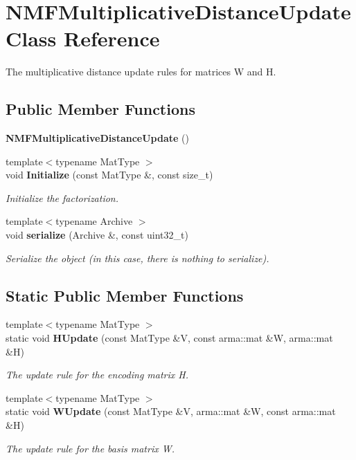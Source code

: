 \section{N\+M\+F\+Multiplicative\+Distance\+Update Class Reference}
\label{classmlpack_1_1amf_1_1NMFMultiplicativeDistanceUpdate}


The multiplicative distance update rules for matrices W and H.  


\subsection*{Public Member Functions}
\begin{DoxyCompactItemize}
\item 
\textbf{ N\+M\+F\+Multiplicative\+Distance\+Update} ()
\item 
{\footnotesize template$<$typename Mat\+Type $>$ }\\void \textbf{ Initialize} (const Mat\+Type \&, const size\+\_\+t)
\begin{DoxyCompactList}\small\item\em Initialize the factorization. \end{DoxyCompactList}\item 
{\footnotesize template$<$typename Archive $>$ }\\void \textbf{ serialize} (Archive \&, const uint32\+\_\+t)
\begin{DoxyCompactList}\small\item\em Serialize the object (in this case, there is nothing to serialize). \end{DoxyCompactList}\end{DoxyCompactItemize}
\subsection*{Static Public Member Functions}
\begin{DoxyCompactItemize}
\item 
{\footnotesize template$<$typename Mat\+Type $>$ }\\static void \textbf{ H\+Update} (const Mat\+Type \&V, const arma\+::mat \&W, arma\+::mat \&H)
\begin{DoxyCompactList}\small\item\em The update rule for the encoding matrix H. \end{DoxyCompactList}\item 
{\footnotesize template$<$typename Mat\+Type $>$ }\\static void \textbf{ W\+Update} (const Mat\+Type \&V, arma\+::mat \&W, const arma\+::mat \&H)
\begin{DoxyCompactList}\small\item\em The update rule for the basis matrix W. \end{DoxyCompactList}\end{DoxyCompactItemize}


